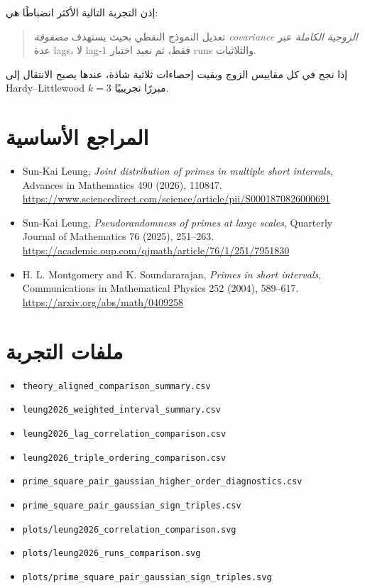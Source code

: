 \documentclass[12pt]{article}
\begin{document}
إذن التجربة التالية الأكثر انضباطًا هي:

\begin{quote}
تعديل النموذج النقطي بحيث يستهدف \emph{مصفوفة covariance الزوجية الكاملة}
عبر عدة lags، لا lag-1 فقط، ثم نعيد اختبار runs والثلاثيات.
\end{quote}

إذا نجح في كل مقاييس الزوج وبقيت إحصاءات ثلاثية شاذة، عندها يصبح الانتقال
إلى Hardy--Littlewood \(k=3\) مبررًا تجريبيًا.

\section{المراجع الأساسية}

\begin{itemize}
\item Sun-Kai Leung,
\emph{Joint distribution of primes in multiple short intervals},
Advances in Mathematics 490 (2026), 110847.
\url{https://www.sciencedirect.com/science/article/pii/S0001870826000691}

\item Sun-Kai Leung,
\emph{Pseudorandomness of primes at large scales},
Quarterly Journal of Mathematics 76 (2025), 251--263.
\url{https://academic.oup.com/qjmath/article/76/1/251/7951830}

\item H. L. Montgomery and K. Soundararajan,
\emph{Primes in short intervals},
Communications in Mathematical Physics 252 (2004), 589--617.
\url{https://arxiv.org/abs/math/0409258}
\end{itemize}

\section{ملفات التجربة}

\begin{itemize}
\item \texttt{theory\_aligned\_comparison\_summary.csv}
\item \texttt{leung2026\_weighted\_interval\_summary.csv}
\item \texttt{leung2026\_lag\_correlation\_comparison.csv}
\item \texttt{leung2026\_triple\_ordering\_comparison.csv}
\item \texttt{prime\_square\_pair\_gaussian\_higher\_order\_diagnostics.csv}
\item \texttt{prime\_square\_pair\_gaussian\_sign\_triples.csv}
\item \texttt{plots/leung2026\_correlation\_comparison.svg}
\item \texttt{plots/leung2026\_runs\_comparison.svg}
\item \texttt{plots/prime\_square\_pair\_gaussian\_sign\_triples.svg}
\end{itemize}
\end{document}
